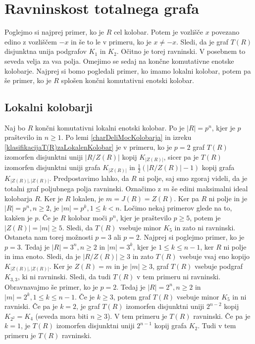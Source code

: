 \documentclass[a4paper, 12pt]{amsart}
\theoremstyle{definition} %
\theoremstyle{plain} %
\begin{document}
\section{Ravninskost totalnega grafa}

Poglejmo si najprej primer, ko je $R$ cel kolobar. Potem je vozlišče $x$ povezano edino z vozliščem $-x$ in še to le v primeru, ko je $x\neq -x$. Sledi, da je graf $T(R)$ disjunktna unija podgrafov $K_1$ in $K_2$. Očitno je torej ravninski. V posebnem to seveda velja za vsa polja. Omejimo se sedaj na končne komutativne enotske kolobarje.  Najprej si bomo pogledali primer, ko imamo lokalni kolobar, potem pa še primer, ko je $R$ splošen končni komutativni enotski kolobar.

\subsection{Lokalni kolobarji}

Naj bo $R$ končni komutativni lokalni enotski kolobar. Po \cite[Posledica 2.4]{diploma} je $|R| = p^n$, kjer je $p$ praštevilo in $n\ge 1$. Po lemi \ref{charDeliMocKolobarja} in izreku \ref{klasifikacijaT(R)zaLokalenKolobar} je v primeru, ko je $p=2$ graf $T(R)$ izomorfen disjunktni uniji $|R/Z(R)|$ kopij $K_{|Z(R)|}$, sicer pa je $T(R)$ izomorfen disjunktni uniji grafa $K_{|Z(R)|}$ in $\frac{1}{2}(|R/Z(R)| - 1)$ kopij grafa $K_{|Z(R)|,|Z(R)|}$.
Predpostavimo lahko, da $R$ ni polje, saj smo zgoraj videli, da je totalni graf poljubnega polja ravninski. Označimo z $m$ še edini maksimalni ideal kolobarja $R$. Ker je $R$ lokalen, je $m=J(R) = Z(R)$. Ker pa $R$ ni polje in je $|R|=p^n, n \ge 2$, je  $|m| = p^k, 1\le k < n$. Ločimo nekaj primerov glede na to, kakšen je $p$. Če je $R$ kolobar moči $p ^n$, kjer je praštevilo $p\ge5$, potem je $|Z(R)| = |m| \ge 5$. Sledi, da $T(R)$ vsebuje minor $K_5$ in  zato ni ravninski. Ostaneta nam torej možnosti $p=3$ ali $p=2$. Najprej si poglejmo primer, ko je $p=3$. Tedaj je $|R|= 3^n, n\ge  2$ in $|m| = 3^k$, kjer je $1\le k \le n-1$, ker $R$ ni polje in ima enoto. Sledi, da je $|R/Z(R)| \ge 3$ in zato $T(R)$ vsebuje vsaj eno kopijo $K_{|Z(R)|,|Z(R)|}$. Ker je $Z(R)= m$ in je $|m| \ge 3$, graf $T(R)$ vsebuje podgraf $K_{3,3}$, ki ni ravninski. Sledi, da tudi $T(R)$ v tem primeru ni ravninski. Obravnavajmo še primer, ko je $p=2$. Tedaj je $|R| = 2^n, n\ge 2$ in $|m| = 2^k, 1 \le k \le n-1$. Če je $k\ge 3$, potem graf $T(R)$ vsebuje minor $K_5$ in ni ravniski. Če pa je $k=2$, je graf $T(R)$ izomorfen disjunktni uniji $2^{n-2}$ kopij $K_{2^2} = K_4$ (seveda mora biti $n\ge 3$). V tem primeru je $T(R)$ ravninski. Če pa je $k=1$, je $T(R)$ izomorfen disjunktni uniji $2^{n-1}$ kopij grafa $K_2$. Tudi v tem primeru je $T(R)$ ravninski. 
\end{document}
